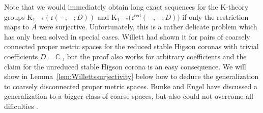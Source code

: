 \documentclass[pdftex]{sigma}
\numberwithin{equation}{section}
\theoremstyle{definition}
\newcommand{\C}{\mathbb{C}}
\newcommand{\K}{\mathrm{K}}
\newcommand{\sHigCor}{\mathfrak{c}}
\newcommand{\sHigCorRed}{\mathfrak{c}^{\mathrm{red}}}
\begin{document}
{\sloppy Note that we would immediately obtain long exact sequences for the $\K$-theory groups $\K_{1-*}(\sHigCor(-,-;D))$ and $\K_{1-*}\big(\sHigCorRed(-,-;D)\big)$ if only the restriction maps to $A$ were surjective. Unfortunately, this is a rather delicate problem which has only been solved in special cases. Willett had shown it for pairs of coarsely connected proper metric spaces for the reduced stable Higson coronas with trivial coefficients $D=\C$ \cite[Lemma 3.4]{WillettHomological}, but the proof also works for arbitrary coefficients and the claim for the unreduced stable Higson corona is an easy consequence. We will show in Lemma~\ref{lem:Willettssurjectivity} below how to deduce the generalization to coarsely disconnected proper metric spaces.
Bunke and Engel have discussed a generalization to a bigger class of coarse spaces, but also could not overcome all dificulties \cite[Section 5]{BunkeEngel_CoarseCohomologyTheories}.

}
\end{document}
